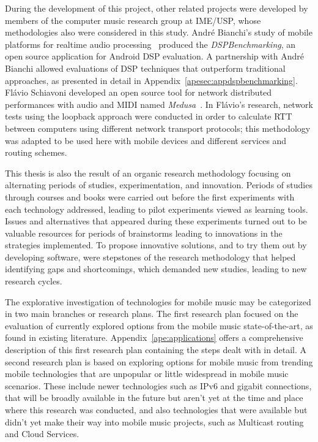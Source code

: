 During the development of this project, other related projects were developed by members of the computer music research group at IME/USP, whose methodologies also were considered in this study.
André Bianchi's study of mobile platforms for realtime audio processing~\citep{Bianchi2012ontheperformance} produced the \textit{DSPBenchmarking}, an open source application for Android DSP evaluation.
A partnership with André Bianchi allowed evaluations of DSP techniques that outperform traditional approaches, as presented in detail in Appendix~\ref{apesec:appdspbenchmarking}.
Flávio Schiavoni developed an open source tool for network distributed performances with audio and MIDI named \textit{Medusa}~\citep{Schiavoni2011medusa}.
In Flávio's research, network tests using the loopback approach were conducted in order to calculate RTT between computers using different network transport protocols; this methodology was adapted to be used here with mobile devices and different services and routing schemes.

This thesis is also the result of an organic research methodology focusing on alternating periods of studies, experimentation, and innovation.
Periods of studies through courses and books were carried out before the first experiments with each technology addressed, leading to pilot experiments viewed as learning tools.
Issues and alternatives that appeared during these experiments turned out to be valuable resources for periods of brainstorms leading to innovations in the strategies implemented.
To propose innovative solutions, and to try them out by developing software, were stepstones of the research methodology that helped identifying gaps and shortcomings, which demanded new studies, leading to new research cycles.

The explorative investigation of technologies for mobile music may be categorized in two main branches or research plans.
The first research plan focused on the evaluation of currently explored options from the mobile music state-of-the-art, as found in existing literature.
Appendix~\ref{ape:applications} offers a comprehensive description of this first research plan containing the steps dealt with in detail.
A second research plan is based on exploring options for mobile music from trending mobile technologies that are unpopular or little widespread in mobile music scenarios. 
These include newer technologies such as IPv6 and gigabit connections, that will be broadly available in the future but aren't yet at the time and place where this research was conducted, and also technologies that were available but didn't yet make their way into mobile music projects, such as Multicast routing and Cloud Services.

